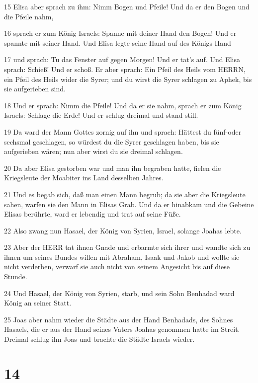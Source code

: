 \par 15 Elisa aber sprach zu ihm: Nimm Bogen und Pfeile! Und da er den Bogen und die Pfeile nahm,
\par 16 sprach er zum König Israels: Spanne mit deiner Hand den Bogen! Und er spannte mit seiner Hand. Und Elisa legte seine Hand auf des Königs Hand
\par 17 und sprach: Tu das Fenster auf gegen Morgen! Und er tat's auf. Und Elisa sprach: Schieß! Und er schoß. Er aber sprach: Ein Pfeil des Heils vom HERRN, ein Pfeil des Heils wider die Syrer; und du wirst die Syrer schlagen zu Aphek, bis sie aufgerieben sind.
\par 18 Und er sprach: Nimm die Pfeile! Und da er sie nahm, sprach er zum König Israels: Schlage die Erde! Und er schlug dreimal und stand still.
\par 19 Da ward der Mann Gottes zornig auf ihn und sprach: Hättest du fünf-oder sechsmal geschlagen, so würdest du die Syrer geschlagen haben, bis sie aufgerieben wären; nun aber wirst du sie dreimal schlagen.
\par 20 Da aber Elisa gestorben war und man ihn begraben hatte, fielen die Kriegsleute der Moabiter ins Land desselben Jahres.
\par 21 Und es begab sich, daß man einen Mann begrub; da sie aber die Kriegsleute sahen, warfen sie den Mann in Elisas Grab. Und da er hinabkam und die Gebeine Elisas berührte, ward er lebendig und trat auf seine Füße.
\par 22 Also zwang nun Hasael, der König von Syrien, Israel, solange Joahas lebte.
\par 23 Aber der HERR tat ihnen Gnade und erbarmte sich ihrer und wandte sich zu ihnen um seines Bundes willen mit Abraham, Isaak und Jakob und wollte sie nicht verderben, verwarf sie auch nicht von seinem Angesicht bis auf diese Stunde.
\par 24 Und Hasael, der König von Syrien, starb, und sein Sohn Benhadad ward König an seiner Statt.
\par 25 Joas aber nahm wieder die Städte aus der Hand Benhadads, des Sohnes Hasaels, die er aus der Hand seines Vaters Joahas genommen hatte im Streit. Dreimal schlug ihn Joas und brachte die Städte Israels wieder.

\chapter{14}

